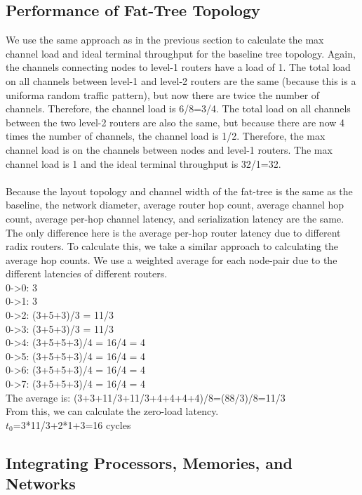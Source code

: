 \documentclass[10pt]{article}
\begin{document}
\subsection{Performance of Fat-Tree Topology}
We use the same approach as in the previous section to calculate the max channel load and ideal terminal throughput for the baseline tree topology. Again, the channels connecting nodes to level-1 routers have a load of 1. The total load on all channels between level-1 and level-2 routers are the same (because this is a uniforma random traffic pattern), but now there are twice the number of channels. Therefore, the channel load is 6/8=3/4. The total load on all channels between the two level-2 routers are also the same, but because there are now 4 times the number of channels, the channel load is 1/2. Therefore, the max channel load is on the channels between nodes and level-1 routers. The max channel load is 1 and the ideal terminal throughput is 32/1=32.\\
\\
Because the layout topology and channel width of the fat-tree is the same as the baseline, the network diameter, average router hop count, average channel hop count, average per-hop channel latency, and serialization latency are the same.\\
The only difference here is the average per-hop router latency due to different radix routers. To calculate this, we take a similar approach to calculating the average hop counts. We use a weighted average for each node-pair due to the different latencies of different routers.\\
0->0: 3\\
0->1: 3\\
0->2: (3+5+3)/3 = 11/3\\
0->3: (3+5+3)/3 = 11/3\\
0->4: (3+5+5+3)/4 = 16/4 = 4\\
0->5: (3+5+5+3)/4 = 16/4 = 4\\ 
0->6: (3+5+5+3)/4 = 16/4 = 4\\ 
0->7: (3+5+5+3)/4 = 16/4 = 4\\
The average is: (3+3+11/3+11/3+4+4+4+4)/8=(88/3)/8=11/3\\
From this, we can calculate the zero-load latency.\\
$t_0$=3*11/3+2*1+3=16 cycles
\subsection{Integrating Processors, Memories, and Networks}
\end{document}
